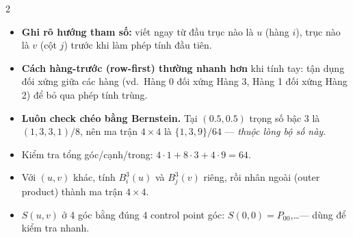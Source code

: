 \begin{paracol}{2}
\begin{itemize}[leftmargin=*,nosep]
  \item \textbf{Ghi rõ hướng tham số:} viết ngay từ đầu trục nào là $u$ (hàng $i$), trục nào là $v$ (cột $j$) trước khi làm phép tính đầu tiên.
  \item \textbf{Cách hàng-trước (row-first) thường nhanh hơn} khi tính tay: tận dụng đối xứng giữa các hàng (vd.\ Hàng 0 đối xứng Hàng 3, Hàng 1 đối xứng Hàng 2) để bỏ qua phép tính trùng.
  \item \textbf{Luôn check chéo bằng Bernstein.} Tại $(0.5,0.5)$ trọng số bậc 3 là $(1,3,3,1)/8$, nên ma trận $4\times4$ là $\{1,3,9\}/64$ --- \emph{thuộc lòng bộ số này}.
  \item Kiểm tra tổng góc/cạnh/trong: $4{\cdot}1+8{\cdot}3+4{\cdot}9=64$.
  \item Với $(u,v)$ khác, tính $B_i^3(u)$ và $B_j^3(v)$ riêng, rồi nhân ngoài (outer product) thành ma trận $4\times4$.
  \item $S(u,v)$ ở 4 góc bằng đúng 4 control point góc: $S(0,0)=P_{00}$,\dots --- dùng để kiểm tra nhanh.
\end{itemize}

\end{paracol}
